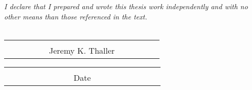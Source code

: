 \vspace{-10em}
\textit{I declare that I prepared and wrote this thesis work independently and with no other means
than those referenced in the text.}
\\
\vspace{5em}
\\


\noindent\begin{tabular}[t]{@{}c}
    \hline\\~~~~~~~~~~Jeremy K. Thaller~~~~~~~~~~
\end{tabular}
\hfill
\begin{tabular}[t]{c@{}}
    \hline\\~~~~~~~~~~~~~~~~Date~~~~~~~~~~~~~~~~
\end{tabular}


